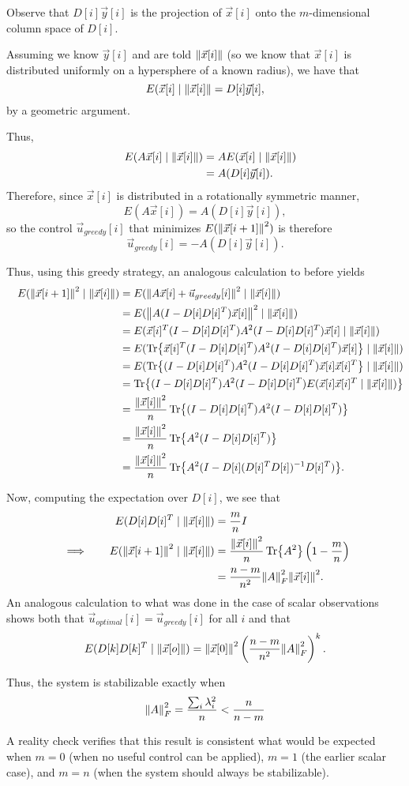 \documentclass[letterpaper]{article}
\theoremstyle{remark}
\newcommand\note[1]{\marginpar{\textcolor{red}{#1}}}
\newcommand{\eqn}[1]{\begin{alignat*}{2}#1\end{alignat*}}
\newcommand*{\thus}{&\implies\quad&}
\begin{document}
Observe that $D[i]\vec{y}[i]$ is the projection of $\vec{x}[i]$ onto the $m$-dimensional column space of $D[i]$.

Assuming we know $\vec{y}[i]$ and are told $\norm{\vec{x}[i]}$ (so we know that $\vec{x}[i]$ is distributed uniformly on a hypersphere of a known radius), we have that
\[
    E(\vec{x}[i] \mid \norm{\vec{x}[i]} = D[i]\vec{y}[i],
\]
by a geometric argument.

Thus,
\eqn{
    && E(A\vec{x}[i] \mid \norm{\vec{x}[i]}) &= AE(\vec{x}[i] \mid \norm{\vec{x}[i]}) \\
    &&&= A(D[i] \vec{y}[i]).
}
Therefore, since $\vec{x}[i]$ is distributed in a rotationally symmetric manner,
\[
    E(A\vec{x}[i]) = A(D[i] \vec{y}[i]),
\]
so the control $\vec{u}_{greedy}[i]$ that minimizes $E(\norm{\vec{x}[i + 1]}^2)$ is therefore
\[
    \vec{u}_{greedy}[i] = -A(D[i] \vec{y}[i]).
\]

Thus, using this greedy strategy, an analogous calculation to before yields
\eqn{
    && E(\norm{\vec{x}[i + 1]}^2 \mid \norm{\vec{x}[i]}) &= E(\norm{A\vec{x}[i] + \vec{u}_{greedy}[i]}^2 \mid \norm{\vec{x}[i]}) \\
    &&&= E(\norm{A(I - D[i]D[i]^T)\vec{x}[i]}^2 \mid \norm{\vec{x}[i]}) \\
    &&&= E(\vec{x}[i]^T(I - D[i]D[i]^T)A^2(I - D[i]D[i]^T) \vec{x}[i] \mid \norm{\vec{x}[i]}) \\
    &&&= E(\Tr{\vec{x}[i]^T(I - D[i]D[i]^T)A^2(I - D[i]D[i]^T) \vec{x}[i]} \mid \norm{\vec{x}[i]}) \\
    &&&= E(\Tr{(I - D[i]D[i]^T)A^2(I - D[i]D[i]^T) \vec{x}[i]\vec{x}[i]^T} \mid \norm{\vec{x}[i]}) \\
    &&&= \Tr{(I - D[i]D[i]^T)A^2(I - D[i]D[i]^T) E(\vec{x}[i]\vec{x}[i]^T \mid \norm{\vec{x}[i]})} \\
    &&&= \frac{\norm{\vec{x}[i]}^2}{n}\Tr{(I - D[i]D[i]^T)A^2(I - D[i]D[i]^T)} \\
    &&&= \frac{\norm{\vec{x}[i]}^2}{n}\Tr{A^2(I - D[i]D[i]^T)} \\
    &&&= \frac{\norm{\vec{x}[i]}^2}{n}\Tr{A^2(I - D[i](D[i]^TD[i])^{-1}D[i]^T)}.
}
\note{Remove last line, left only for fun}

Now, computing the expectation over $D[i]$, we see that
\eqn{
    && E(D[i]D[i]^T \mid \norm{\vec{x}[i]}) &= \frac{m}{n}I \\
    \thus E(\norm{\vec{x}[i + 1]}^2 \mid \norm{\vec{x}[i]}) &= \frac{\norm{\vec{x}[i]}^2}{n} \Tr{A^2} \left(1 - \frac{m}{n}\right) \\
    &&&= \frac{n - m}{n^2} \norm{A}_F^2 \norm{\vec{x}[i]}^2.
}
An analogous calculation to what was done in the case of scalar observations shows both that $\vec{u}_{optimal}[i] = \vec{u}_{greedy}[i]$ for all $i$ and that
\[
    E(D[k]D[k]^T \mid \norm{\vec{x}[o]}) = \norm{\vec{x}[0]}^2 \left(\frac{n - m}{n^2} \norm{A}_F^2\right)^{k}.
\]

Thus, the system is stabilizable exactly when
\[
    \norm{A}_F^2 = \frac{\sum_i \lambda_i^2}{n} < \frac{n}{n - m}
\]

A reality check verifies that this result is consistent what would be expected when $m = 0$ (when no useful control can be applied), $m = 1$ (the earlier scalar case), and $m = n$ (when the system should always be stabilizable).
\end{document}
